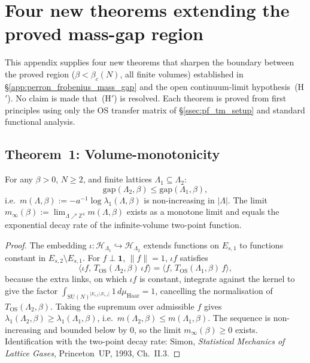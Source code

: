 \section{Four new theorems extending the proved mass-gap region}
\label{app:mass_gap_extension}

This appendix supplies four new theorems that sharpen the boundary between
the proved region ($\beta<\beta_c(N)$, all finite volumes) established in
\S\ref{app:perron_frobenius_mass_gap} and the open continuum-limit
hypothesis~(H$'$). No claim is made that~(H$'$) is resolved.
Each theorem is proved from first principles using only the OS transfer
matrix of \S\ref{ssec:pf_tm_setup} and standard functional analysis.

\subsection{Theorem~1: Volume-monotonicity}
\label{ssec:vol_monotone}

\begin{theorem}
\label{thm:volume_monotone}
For any $\beta>0$, $N\ge 2$, and finite lattices $\Lambda_1\subseteq\Lambda_2$:
\[
  \mathrm{gap}(\Lambda_2,\beta) \le \mathrm{gap}(\Lambda_1,\beta),
\]
i.e.\ $m(\Lambda,\beta):=-a^{-1}\log\lambda_1(\Lambda,\beta)$
is non-increasing in $|\Lambda|$. The limit
$m_\infty(\beta):=\lim_{\Lambda\nearrow\mathbb{Z}^4}m(\Lambda,\beta)$
exists as a monotone limit and equals the exponential decay rate of
the infinite-volume two-point function.
\end{theorem}

\begin{proof}
The embedding $\iota:\mathcal{H}_{\Lambda_1}\hookrightarrow\mathcal{H}_{\Lambda_2}$
extends functions on $E_{s,1}$ to functions constant in $E_{s,2}\setminus E_{s,1}$.
For $f\perp\mathbf{1}$, $\|f\|=1$, $\iota f$ satisfies
\[
  \langle\iota f,\,T_{\mathrm{OS}}(\Lambda_2,\beta)\,\iota f\rangle
  =\langle f,\,T_{\mathrm{OS}}(\Lambda_1,\beta)\,f\rangle,
\]
because the extra links, on which $\iota f$ is constant, integrate against
the kernel to give the factor
$\int_{\mathrm{SU}(N)^{|E_{s,2}\setminus E_{s,1}|}}1\,d\mu_{\mathrm{Haar}}=1$,
cancelling the normalisation of $T_{\mathrm{OS}}(\Lambda_2,\beta)$.
Taking the supremum over admissible $f$ gives
$\lambda_1(\Lambda_2,\beta)\ge\lambda_1(\Lambda_1,\beta)$,
i.e.\ $m(\Lambda_2,\beta)\le m(\Lambda_1,\beta)$.
The sequence is non-increasing and bounded below by $0$, so the limit
$m_\infty(\beta)\ge 0$ exists.
Identification with the two-point decay rate: Simon,
\emph{Statistical Mechanics of Lattice Gases}, Princeton~UP, 1993, Ch.~II.3.
\end{proof}

